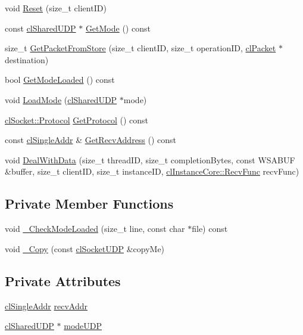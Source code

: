 \begin{DoxyCompactItemize}
void \hyperlink{classcl_socket_u_d_p_a9a55042801aeea2a7f50ab7efa71ac15}{Reset} (size\_\-t clientID)
\item 
const \hyperlink{classcl_shared_u_d_p}{clSharedUDP} $\ast$ \hyperlink{classcl_socket_u_d_p_ae2ac63727ddaf73c46964090736167a9}{GetMode} () const 
\item 
size\_\-t \hyperlink{classcl_socket_u_d_p_aa36a790d653788f2a2f4f52aaa0a7f86}{GetPacketFromStore} (size\_\-t clientID, size\_\-t operationID, \hyperlink{classcl_packet}{clPacket} $\ast$destination)
\item 
bool \hyperlink{classcl_socket_u_d_p_a8712ad9eb11883ce5d118fb84fb10399}{GetModeLoaded} () const 
\item 
void \hyperlink{classcl_socket_u_d_p_a7653fbe14806476dbba906ca3d79bc9d}{LoadMode} (\hyperlink{classcl_shared_u_d_p}{clSharedUDP} $\ast$mode)
\item 
\hyperlink{classcl_simple_socket_affcd3d22c1abba5d20a0ae93472c576d}{clSocket::Protocol} \hyperlink{classcl_socket_u_d_p_a4016f07d693331c87be1649aa69df9f6}{GetProtocol} () const 
\item 
const \hyperlink{classcl_single_addr}{clSingleAddr} \& \hyperlink{classcl_socket_u_d_p_aa4b27fd0a368cfe874a4a4cb534dac0d}{GetRecvAddress} () const 
\item 
void \hyperlink{classcl_socket_u_d_p_a5dbfc8b8689613b2def26ed5a322ba5f}{DealWithData} (size\_\-t threadID, size\_\-t completionBytes, const WSABUF \&buffer, size\_\-t clientID, size\_\-t instanceID, \hyperlink{classcl_instance_core_afa96c2a2c0b26b6a9256b87798bf9587}{clInstanceCore::RecvFunc} recvFunc)
\end{DoxyCompactItemize}
\subsection*{Private Member Functions}
\begin{DoxyCompactItemize}
\item 
void \hyperlink{classcl_socket_u_d_p_a022574446b94cc601e51fd657defc266}{\_\-CheckModeLoaded} (size\_\-t line, const char $\ast$file) const 
\item 
void \hyperlink{classcl_socket_u_d_p_a34a5f52b8462ef4dce5a0e74aa185e63}{\_\-Copy} (const \hyperlink{classcl_socket_u_d_p}{clSocketUDP} \&copyMe)
\end{DoxyCompactItemize}
\subsection*{Private Attributes}
\begin{DoxyCompactItemize}
\item 
\hyperlink{classcl_single_addr}{clSingleAddr} \hyperlink{classcl_socket_u_d_p_a4011a7b3c5a811ac54e477a95c87a402}{recvAddr}
\item 
\hyperlink{classcl_shared_u_d_p}{clSharedUDP} $\ast$ \hyperlink{classcl_socket_u_d_p_a6291807aa55d5fe97be5b398d56f4fa7}{modeUDP}
\end{DoxyCompactItemize}


